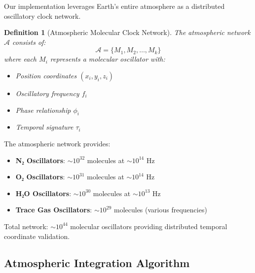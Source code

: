 \documentclass[12pt,a4paper]{article}
\newtheorem{definition}{Definition}
\begin{document}
Our implementation leverages Earth's entire atmosphere as a distributed oscillatory clock network.

\begin{definition}[Atmospheric Molecular Clock Network]
The atmospheric network $\mathcal{A}$ consists of:
$$\mathcal{A} = \{M_1, M_2, \ldots, M_k\}$$
where each $M_i$ represents a molecular oscillator with:
\begin{itemize}
\item Position coordinates $(x_i, y_i, z_i)$
\item Oscillatory frequency $f_i$
\item Phase relationship $\phi_i$
\item Temporal signature $\tau_i$
\end{itemize}
\end{definition}

The atmospheric network provides:
\begin{itemize}
\item \textbf{N₂ Oscillators}: $\sim 10^{32}$ molecules at $\sim 10^{14}$ Hz
\item \textbf{O₂ Oscillators}: $\sim 10^{31}$ molecules at $\sim 10^{14}$ Hz
\item \textbf{H₂O Oscillators}: $\sim 10^{30}$ molecules at $\sim 10^{13}$ Hz
\item \textbf{Trace Gas Oscillators}: $\sim 10^{29}$ molecules (various frequencies)
\end{itemize}

Total network: $\sim 10^{44}$ molecular oscillators providing distributed temporal coordinate validation.

\subsection{Atmospheric Integration Algorithm}
\end{document}
